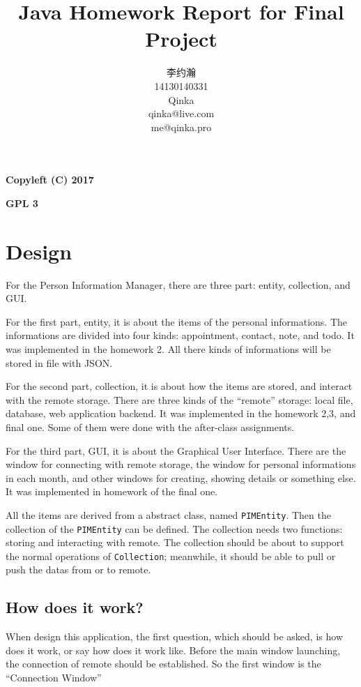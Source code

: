 \documentclass{article}
\title{Java Homework Report for Final Project}
\author{李约瀚 \\ 14130140331 \\ Qinka \\ qinka@live.com \\ me@qinka.pro}
\begin{document}
\maketitle
\newpage

{\Huge \textbf{Copyleft (C) 2017}}
\par
{\Huge \textbf{GPL 3}}
\newpage

\tableofcontents
\newpage

\section{Design}
\label{sec:design}

For the Person Information Manager, there are three part: entity, collection, and GUI.

For the first part, entity, it is about the items of the personal informations. The informations are divided into four kinds: appointment, contact, note, and todo.
It was implemented in the homework 2. All there kinds of informations will be stored in file with JSON.

For the second part, collection, it is about how the items are stored, and interact with the remote storage.
There are three kinds of the ``remote'' storage: local file, database, web application backend.
It was implemented in the homework 2,3, and final one. Some of them were done with the after-class assignments.

For the third part, GUI, it is about the Graphical User Interface. There are the window for connecting with remote storage, the window for personal informations
in each month, and other windows for creating, showing details or something else.
It was implemented in homework of the final one.

All the items are derived from a abstract class, named \lstinline|PIMEntity|. Then the collection of the \lstinline|PIMEntity| can be defined.
The collection needs two functions: storing and interacting with remote. The collection should be about to support the normal operations of \lstinline|Collection|; meanwhile, it should be able to pull or push the datas from or to remote.

\subsection{How does it work?}
\label{sec:design:hiw}

When design this application, the first question, which should be asked, is how does it work, or say how does it work like.
Before the main window launching, the connection of remote should be established. So the first window is the ``Connection Window''
\end{document}
